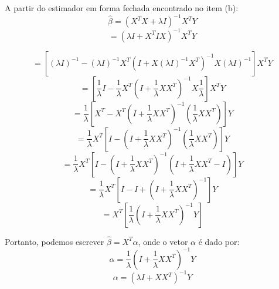 A partir do estimador em forma fechada encontrado no item (b):
$$ \hat{\beta} = (X^T X + \lambda I)^{-1}X^T Y $$
$$ = (\lambda I + X^T I X)^{-1} X^T Y$$

$$ = \left[(\lambda I)^{-1} - (\lambda I)^{-1}X^T(I + X(\lambda I)^{-1}X^T)^{-1}X(\lambda I)^{-1} \right] X^T Y $$
$$ = \left[\frac{1}{\lambda}I - \frac{1}{\lambda}X^T \left(I + \frac{1}{\lambda}XX^T \right)^{-1} X\frac{1}{\lambda} \right] X^T Y $$
$$ = \frac{1}{\lambda} \left[ X^T - X^T \left(I + \frac{1}{\lambda}XX^T \right)^{-1} \left(\frac{1}{\lambda}XX^T \right) \right] Y $$
$$ = \frac{1}{\lambda} X^T \left[ I - \left(I + \frac{1}{\lambda}XX^T \right)^{-1} \left(\frac{1}{\lambda}XX^T \right) \right] Y $$
$$ = \frac{1}{\lambda} X^T \left[ I - \left(I + \frac{1}{\lambda}XX^T \right)^{-1} \left(I + \frac{1}{\lambda}XX^T - I \right) \right] Y $$
$$ = \frac{1}{\lambda} X^T \left[ I - I + \left(I + \frac{1}{\lambda}XX^T \right)^{-1} \right] Y $$
$$ = X^T \left[ \frac{1}{\lambda} \left(I + \frac{1}{\lambda}XX^T \right)^{-1} Y \right] $$

Portanto, podemos escrever $ \hat{\beta} = X^T \alpha $, onde o vetor $ \alpha $ é dado por:
$$ \alpha = \frac{1}{\lambda} \left(I + \frac{1}{\lambda}XX^T \right)^{-1} Y $$
$$ \alpha = \left( \lambda I + XX^T \right)^{-1} Y $$
